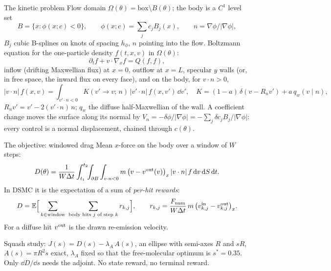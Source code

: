 \begin{frame}{The kinetic problem}
Flow domain $\Omega(\theta) = \text{box}\setminus B(\theta)$; the body is a $C^1$ level set
\[
B = \{x : \phi(x; c) < 0\},\qquad \phi(x;c) = \sum_j c_j B_j(x),\qquad n = \nabla\phi/|\nabla\phi| ,
\]
$B_j$ cubic B-splines on knots of spacing $h_\phi$, $n$ pointing into the flow.
Boltzmann equation for the one-particle density $f(t,x,v)$ in $\Omega(\theta)$:
\[
\partial_t f + v\cdot\nabla_x f = Q(f,f),
\]
inflow (drifting Maxwellian flux) at $x = 0$, outflow at $x = L$, specular $y$ walls (or, in free
space, the inward flux on every face), and on the body, for $v\cdot n > 0$,
\[
|v\cdot n|\, f(x, v) = \int_{v'\cdot n<0} K(v' \to v;\, n)\, |v'\cdot n|\, f(x, v')\,\dd v',
\quad K = (1-a)\,\delta(v - R_n v') + a\, q_w(v\mid n),
\]
$R_n v' = v' - 2(v'\cdot n)\,n$; $q_w$ the diffuse half-Maxwellian of the wall.
A coefficient change moves the surface along its normal by
$V_n = -\delta\phi/|\nabla\phi| = -\sum_j \delta c_j B_j/|\nabla\phi|$: every control is a
normal displacement, chained through $c(\theta)$.
\end{frame}

\begin{frame}{The objective: windowed drag}
Mean $x$-force on the body over a window of $W$ steps:
\[
D(\theta) = \frac{1}{W\Delta t}\int_{t_1}^{t_2}\!\!\int_{\partial B}\int_{v\cdot n<0}
m\,\big(v - v^{\mathrm{out}}(v)\big)_x\,|v\cdot n|\, f\,\mathrm{d} v\,\mathrm{d} S\,\mathrm{d} t .
\]
In DSMC it is the expectation of a sum of \emph{per-hit rewards}:
\[
D = \mathbb{E}\Big[\sum_{k\in\text{window}}\ \sum_{\text{body hits } j \text{ of step } k} r_{k,j}\Big],
\qquad
r_{k,j} = \frac{F_{\mathrm{num}}}{W\Delta t}\, m\,\big(v^{\mathrm{in}}_{k,j} - v^{\mathrm{out}}_{k,j}\big)_x .
\]
For a diffuse hit $v^{\mathrm{out}}$ is the drawn re-emission velocity.

\medskip
Squash study: $J(s) = D(s) - \lambda_A\,A(s)$, an ellipse with semi-axes $R$ and $sR$,
$A(s) = \pi R^2 s$ exact, $\lambda_A$ fixed so that the free-molecular optimum is $s^* = 0.35$.
Only $\dd D/\dd s$ needs the adjoint.  No state reward, no terminal reward.
\end{frame}

